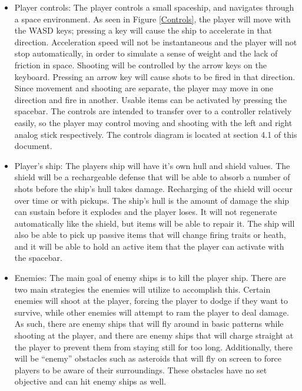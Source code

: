 \documentclass[12pt]{article}       %
\begin{document}
\begin{itemize}
\item Player controls: The player controls a small spaceship, and navigates through a space environment. As seen in Figure \ref{Controls}, the player will move with the WASD keys; pressing a key will cause the ship to accelerate in that direction. Acceleration speed will not be instantaneous and the player will not stop automatically, in order to simulate a sense of weight and the lack of friction in space. Shooting will be controlled by the arrow keys on the keyboard. Pressing an arrow key will cause shots to be fired in that direction. Since movement and shooting are separate, the player may move in one direction and fire in another. Usable items can be activated by pressing the spacebar. The controls are intended to transfer over to a controller relatively easily, so the player may control moving and shooting with the left and right analog stick respectively. The controls diagram is located at section 4.1 of this document.

\item Player’s ship: The players ship will have it’s own hull and shield values. The shield will be a rechargeable defense that will be able to absorb a number of shots before the ship’s hull takes damage. Recharging of the shield will occur over time or with pickups. The ship’s hull is the amount of damage the ship can sustain before it explodes and the player loses. It will not regenerate automatically like the shield, but items will be able to repair it. The ship will also be able to pick up passive items that will change firing traits or heath, and it will be able to hold an active item that the player can activate with the spacebar.

\item Enemies: The main goal of enemy ships is to kill the player ship. There are two main strategies the enemies will utilize to accomplish this. Certain enemies will shoot at the player, forcing the player to dodge if they want to survive, while other enemies will attempt to ram the player to deal damage. As such, there are enemy ships that will fly around in basic patterns while shooting at the player, and there are enemy ships that will charge straight at the player to prevent them from staying still for too long. Additionally, there will be “enemy” obstacles such as asteroids that will fly on screen to force players to be aware of their surroundings. These obstacles have no set objective and can hit enemy ships as well.


\end{itemize}
\end{document}
